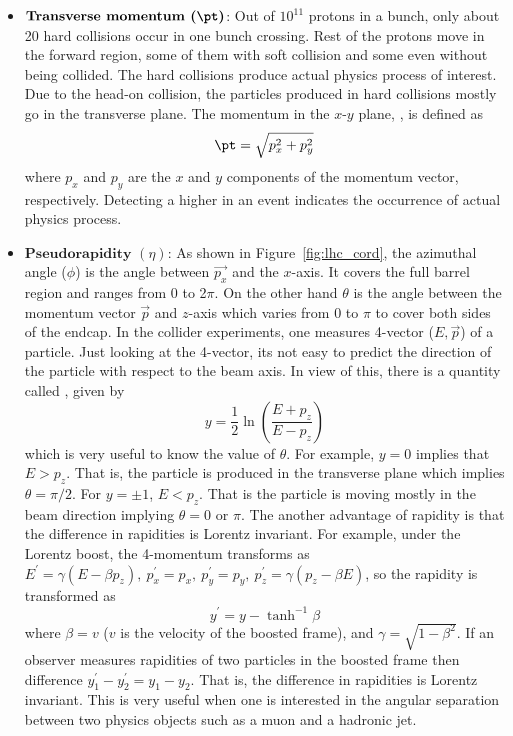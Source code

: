 \begin{itemize}[leftmargin=*]
\item $\textbf{Transverse momentum (\pt)}$: 
	Out of $10^{11}$ protons in a bunch, only about 20 hard collisions occur 
	in one bunch crossing. Rest of the protons move in the forward region, some of 
	them with soft collision and some even without being collided. The hard 
	collisions produce actual physics process of interest. Due to the head-on 
	collision, the particles produced in hard collisions mostly go in the transverse 
	plane. The momentum in the $x$-$y$ plane, \pt, is defined as
	\begin{equation}
		\pt = \sqrt{p_x^2 + p_y^2}
	\end{equation}
	where $p_x$ and $p_y$ are the $x$ and $y$ components of the momentum vector, respectively. 
	Detecting a higher \pt in an event indicates the occurrence of actual physics process.
\item $\textbf{Pseudorapidity $(\eta)$}$: As shown in Figure~\ref{fig:lhc_cord}, 
	the azimuthal angle ($\phi$) is the angle between $\vec{p_x}$ and the $x$-axis. 
	It covers the full barrel region and ranges from 0 to 2$\pi$. On the other hand $\theta$ 
	is the angle between the momentum vector $\vec{p}$ and $z$-axis which varies from 0 to 
	$\pi$ to cover both sides of the endcap. 
	In the collider experiments, one measures 4-vector ($E, \vec{p}$) of a 
	particle. Just looking at the 4-vector, its not easy to predict the direction
	of the particle with respect to the beam axis. In view of this, there is a quantity 
	called , given by \cite{EDaw}
	\begin{equation}
		y = \frac{1}{2}\ln\left(\frac{E+p_z}{E-p_z}\right)
	\label{eq:lhc_y}
	\end{equation}
	which is very useful to know the value of $\theta$. For example, $y = 0$ implies 
	that $E > p_z$. That is, the particle is produced in the transverse plane which
	implies $\theta = \pi/2$. For $y = \pm 1$, $E<p_z$. That is the particle is
	moving mostly in the beam direction implying $\theta = 0$ or $\pi$. The
	another advantage of rapidity is that the difference in rapidities is Lorentz 
	invariant. For example, under the Lorentz boost, the 4-momentum transforms as 
	$E^\prime = \gamma (E-\beta p_z) , ~p^\prime_x = p_x, ~p^\prime_y = p_y, ~p^\prime_z = \gamma(p_z - \beta E)$, so the rapidity is transformed as
	\begin{equation}
		y^\prime = y - \tanh^{-1}\beta
	\end{equation}
	where $\beta = v$ ($v$ is the velocity of the boosted frame), and 
	$\gamma = \sqrt{1-\beta^2}$. If an observer measures rapidities of two particles
	in the boosted frame then difference $y_1^\prime -y_2^\prime = y_1 - y_2$.
	That is, the difference in rapidities is Lorentz invariant. This is very useful
	when one is interested in the angular separation between two physics objects such
	as a muon and a hadronic jet.


\end{itemize}
